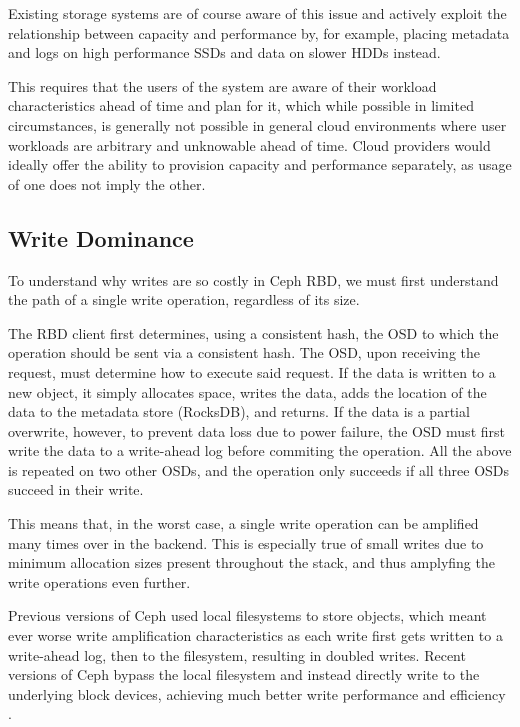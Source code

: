 Existing storage systems are of course aware of this issue and actively exploit
the relationship between capacity and performance by, for example, placing
metadata and logs on high performance SSDs and data on slower HDDs instead.

This requires that the users of the system are aware of their workload
characteristics ahead of time and plan for it, which while possible in limited
circumstances, is generally not possible in general cloud environments where
user workloads are arbitrary and unknowable ahead of time. Cloud providers would
ideally offer the ability to provision capacity and performance separately, as
usage of one does not imply the other.


\subsection{Write Dominance}

To understand why writes are so costly in Ceph RBD, we must first understand
the path of a single write operation, regardless of its size.

The RBD client first determines, using a consistent hash, the OSD to which the
operation should be sent via a consistent hash. The OSD, upon receiving the
request, must determine how to execute said request. If the data is written to a
new object, it simply allocates space, writes the data, adds the location of the
data to the metadata store (RocksDB), and returns. If the data is a partial
overwrite, however, to prevent data loss due to power failure, the OSD must
first write the data to a write-ahead log before commiting the operation. All
the above is repeated on two other OSDs, and the operation only succeeds if
all three OSDs succeed in their write.

This means that, in the worst case, a single write operation can be amplified
many times over in the backend. This is especially true of small writes due to
minimum allocation sizes present throughout the stack, and thus amplyfing the
write operations even further.

Previous versions of Ceph used local filesystems to store objects, which meant
ever worse write amplification characteristics as each write first gets written
to a write-ahead log, then to the filesystem, resulting in doubled writes.
Recent versions of Ceph bypass the local filesystem and instead directly write
to the underlying block devices, achieving much better write performance and
efficiency \cite{aghayev2019file}.

